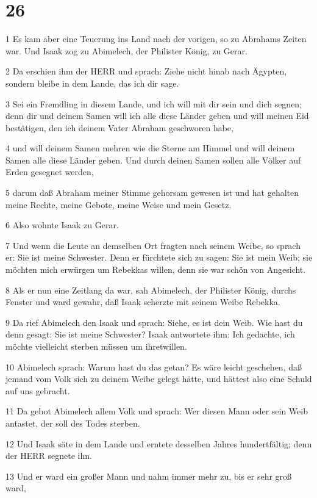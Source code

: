 \chapter{26}

\par 1 Es kam aber eine Teuerung ins Land nach der vorigen, so zu Abrahams Zeiten war. Und Isaak zog zu Abimelech, der Philister König, zu Gerar.
\par 2 Da erschien ihm der HERR und sprach: Ziehe nicht hinab nach Ägypten, sondern bleibe in dem Lande, das ich dir sage.
\par 3 Sei ein Fremdling in diesem Lande, und ich will mit dir sein und dich segnen; denn dir und deinem Samen will ich alle diese Länder geben und will meinen Eid bestätigen, den ich deinem Vater Abraham geschworen habe,
\par 4 und will deinem Samen mehren wie die Sterne am Himmel und will deinem Samen alle diese Länder geben. Und durch deinen Samen sollen alle Völker auf Erden gesegnet werden,
\par 5 darum daß Abraham meiner Stimme gehorsam gewesen ist und hat gehalten meine Rechte, meine Gebote, meine Weise und mein Gesetz.
\par 6 Also wohnte Isaak zu Gerar.
\par 7 Und wenn die Leute an demselben Ort fragten nach seinem Weibe, so sprach er: Sie ist meine Schwester. Denn er fürchtete sich zu sagen: Sie ist mein Weib; sie möchten mich erwürgen um Rebekkas willen, denn sie war schön von Angesicht.
\par 8 Als er nun eine Zeitlang da war, sah Abimelech, der Philister König, durchs Fenster und ward gewahr, daß Isaak scherzte mit seinem Weibe Rebekka.
\par 9 Da rief Abimelech den Isaak und sprach: Siehe, es ist dein Weib. Wie hast du denn gesagt: Sie ist meine Schwester? Isaak antwortete ihm: Ich gedachte, ich möchte vielleicht sterben müssen um ihretwillen.
\par 10 Abimelech sprach: Warum hast du das getan? Es wäre leicht geschehen, daß jemand vom Volk sich zu deinem Weibe gelegt hätte, und hättest also eine Schuld auf uns gebracht.
\par 11 Da gebot Abimelech allem Volk und sprach: Wer diesen Mann oder sein Weib antastet, der soll des Todes sterben.
\par 12 Und Isaak säte in dem Lande und erntete desselben Jahres hundertfältig; denn der HERR segnete ihn.
\par 13 Und er ward ein großer Mann und nahm immer mehr zu, bis er sehr groß ward,
